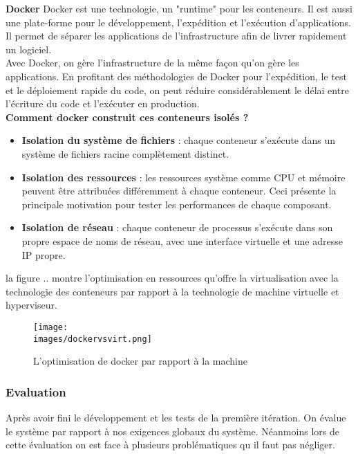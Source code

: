     \textbf{Docker}
    Docker est une technologie, un "runtime" pour les conteneurs. Il est aussi une plate-forme
    pour le développement, l’expédition et l’exécution d’applications. Il permet de séparer
    les applications de l’infrastructure afin de livrer rapidement un logiciel. \\

    Avec Docker, on gère l’infrastructure de la même façon qu’on gère les applications.
    En profitant des méthodologies de Docker pour l’expédition, le test et le déploiement rapide
    du code, on peut réduire considérablement le délai entre l’écriture du code et l’exécuter en
    production.\\
    \textbf{Comment docker construit ces conteneurs isolés ?} \\
    \begin{itemize}
        \item \textbf{Isolation du système de fichiers} : chaque conteneur s’exécute dans un système de fichiers
        racine complètement distinct.
        \item \textbf{Isolation des ressources} : les ressources système comme CPU et mémoire peuvent être
        attribuées différemment à chaque conteneur.  Ceci présente la principale motivation pour tester les performances de chaque composant.
        \item \textbf{Isolation de réseau}  : chaque conteneur de processus s’exécute dans son propre espace de
        noms de réseau, avec une interface virtuelle et une adresse IP propre.
    \end{itemize}

    la figure .. montre l’optimisation en ressources qu’offre la virtualisation avec la technologie
    des conteneurs par rapport à la technologie de machine virtuelle et hyperviseur.

    \begin{figure}[ht]
        \centering
        \texttt{[image: \\images/dockervsvirt.png]}
        \caption{L'optimisation de docker par rapport à la machine }
    \end{figure}
    \break

    \subsubsection{Evaluation}

    Après avoir fini le développement et les tests de la première itération. 
    On évalue le système par rapport à nos exigences globaux du système. 
    Néanmoins lors de cette évaluation on est face à plusieurs problématiques qu il faut pas négliger. 

